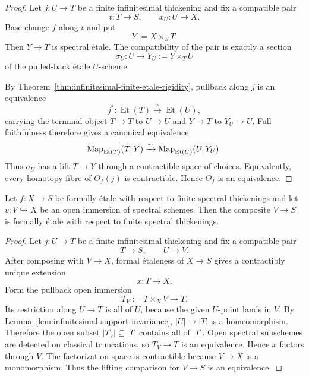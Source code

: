 \begin{proof}
Let $j:U\to T$ be a finite infinitesimal thickening and fix a compatible pair
\[
    t:T\longrightarrow S,
    \qquad
    x_U:U\longrightarrow X.
\]
Base change $f$ along $t$ and put
\[
    Y:=X\times_ST.
\]
Then $Y\to T$ is spectral \'etale.  The compatibility of the pair is exactly a
section
\[
    \sigma_U:U\longrightarrow Y_U:=Y\times_TU
\]
of the pulled-back \'etale $U$-scheme.

By Theorem~\ref{thm:infinitesimal-finite-etale-rigidity}, pullback along $j$
is an equivalence
\[
    j^*:\operatorname{Et}(T)
    \xrightarrow{\simeq}
    \operatorname{Et}(U),
\]
carrying the terminal object $T\to T$ to $U\to U$ and $Y\to T$ to
$Y_U\to U$.  Full faithfulness therefore gives a canonical equivalence
\[
    \operatorname{Map}_{\operatorname{Et}(T)}(T,Y)
    \xrightarrow{\simeq}
    \operatorname{Map}_{\operatorname{Et}(U)}(U,Y_U).
\]
Thus $\sigma_U$ has a lift $T\to Y$ through a contractible space of choices.
Equivalently, every homotopy fibre of $\Theta_f(j)$ is contractible.  Hence
$\Theta_f$ is an equivalence.
\end{proof}

\begin{lemma}
\label{lem:infinitesimal-formal-etale-open-local}
Let $f:X\to S$ be formally \'etale with respect to finite spectral
thickenings and let $v:V\hookrightarrow X$ be an open immersion of spectral
schemes.  Then the composite $V\to S$ is formally \'etale with respect to
finite spectral thickenings.
\end{lemma}

\begin{proof}
Let $j:U\to T$ be a finite infinitesimal thickening and fix a compatible pair
\[
    T\longrightarrow S,
    \qquad
    U\longrightarrow V.
\]
After composing with $V\to X$, formal \'etaleness of $X\to S$ gives a
contractibly unique extension
\[
    x:T\longrightarrow X.
\]
Form the pullback open immersion
\[
    T_V:=T\times_XV\longrightarrow T.
\]
Its restriction along $U\to T$ is all of $U$, because the given $U$-point
lands in $V$.  By Lemma~\ref{lem:infinitesimal-support-invariance},
$|U|\to|T|$ is a homeomorphism.  Therefore the open subset $|T_V|\subseteq|T|$
contains all of $|T|$.  Open spectral subschemes are detected on classical
truncations, so $T_V\to T$ is an equivalence.  Hence $x$ factors through
$V$.  The factorization space is contractible because $V\to X$ is a
monomorphism.  Thus the lifting comparison for $V\to S$ is an equivalence.
\end{proof}


